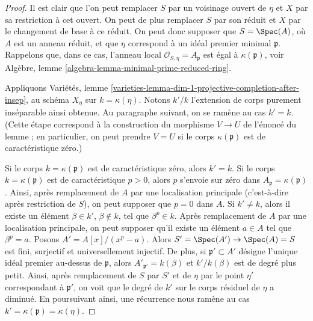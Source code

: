 \begin{proof}
Il est clair que l'on peut remplacer $S$ par un voisinage ouvert de $\eta$
et $X$ par sa restriction à cet ouvert.
On peut de plus remplacer $S$ par son réduit et $X$ par
le changement de base à ce réduit.
On peut donc supposer que $S = \Spec(A)$, où $A$ est un anneau réduit,
et que $\eta$ correspond à un idéal premier minimal $\mathfrak p$.
Rappelons que, dans ce cas, l'anneau local $\mathcal{O}_{S, \eta} = A_\mathfrak p$
est égal à $\kappa(\mathfrak p)$, voir
Algèbre, lemme \ref{algebra-lemma-minimal-prime-reduced-ring}.

\medskip\noindent
Appliquons Variétés, lemme
\ref{varieties-lemma-dim-1-projective-completion-after-insep},
au schéma $X_\eta$ sur $k = \kappa(\eta)$.
Notons $k'/k$ l'extension de corps purement inséparable ainsi obtenue.
Au paragraphe suivant, on se ramène au cas $k' = k$.
(Cette étape correspond à la construction du morphisme $V \to U$ de
l'énoncé du lemme ; en particulier, on peut prendre $V = U$
si le corps $\kappa(\mathfrak p)$ est de caractéristique zéro.)

\medskip\noindent
Si le corps $k = \kappa(\mathfrak p)$ est de caractéristique zéro, alors
$k' = k$. Si le corps $k = \kappa(\mathfrak p)$
est de caractéristique $p > 0$, alors $p$ s'envoie sur zéro dans $A_\mathfrak p = \kappa(\mathfrak p)$.
Ainsi, après remplacement de $A$ par une localisation principale (c'est-à-dire après
restriction de $S$), on peut supposer que $p = 0$ dans $A$. Si $k' \not = k$, alors
il existe un élément $\beta \in k'$, $\beta \not \in k$,
tel que $\beta^p \in k$. Après remplacement de $A$ par une localisation
principale, on peut supposer qu'il existe un élément $a \in A$ tel
que $\beta^p = a$. Posons $A' = A[x]/(x^p - a)$.
Alors $S' = \Spec(A') \to \Spec(A) = S$ est fini, surjectif et
universellement injectif. De plus, si $\mathfrak p' \subset A'$
désigne l'unique idéal premier au-dessus de $\mathfrak p$,
alors $A'_{\mathfrak p'} = k(\beta)$ et $k'/k(\beta)$
est de degré plus petit. Ainsi, après remplacement de $S$ par $S'$
et de $\eta$ par le point $\eta'$ correspondant à $\mathfrak p'$,
on voit que le degré de $k'$ sur le corps résiduel de $\eta$
a diminué. En poursuivant ainsi, une récurrence nous ramène
au cas $k' = \kappa(\mathfrak p) = \kappa(\eta)$.


\end{proof}
